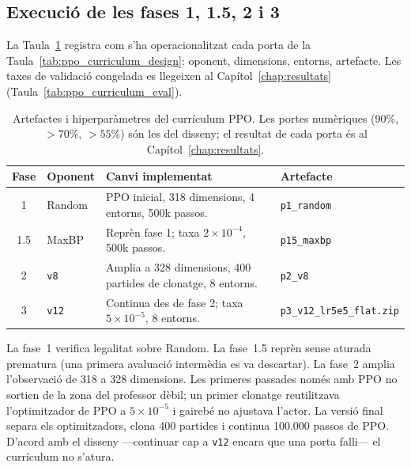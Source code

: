\subsection{Execució de les fases 1, 1.5, 2 i 3}
\label{subsec:ppo_phases_impl}

La Taula~\ref{tab:ppo_curriculum_impl} registra com s'ha operacionalitzat cada porta de la Taula~\ref{tab:ppo_curriculum_design}: oponent, dimensions, entorns, artefacte. Les taxes de validació congelada es llegeixen al Capítol~\ref{chap:resultats} (Taula~\ref{tab:ppo_curriculum_eval}).

\begin{table}[htbp]
    \centering
    \caption{Artefactes i hiperparàmetres del currículum PPO. Les portes numèriques (90\%, $>70\%$, $>55\%$) són les del disseny; el resultat de cada porta és al Capítol~\ref{chap:resultats}.}
    \label{tab:ppo_curriculum_impl}
    \small
    \renewcommand{\arraystretch}{1.25}
    \begin{tabularx}{\textwidth}{cl>{\raggedright\arraybackslash}Xl}
        \toprule
        \textbf{Fase} & \textbf{Oponent} & \textbf{Canvi implementat} & \textbf{Artefacte} \\
        \midrule
        1             & Random           & PPO inicial, 318 dimensions, 4 entorns, 500k passos.          & \texttt{p1\_random} \\
        \arrayrulecolor{gray!30}\hline\arrayrulecolor{black}
        1.5           & MaxBP            & Reprèn fase 1; taxa $2\times10^{-4}$, 500k passos.            & \texttt{p15\_maxbp} \\
        \arrayrulecolor{gray!30}\hline\arrayrulecolor{black}
        2             & \texttt{v8}      & Amplia a 328 dimensions, 400 partides de clonatge, 8 entorns. & \texttt{p2\_v8} \\
        \arrayrulecolor{gray!30}\hline\arrayrulecolor{black}
        3             & \texttt{v12}     & Continua des de fase 2; taxa $5\times10^{-5}$, 8 entorns.     & \texttt{p3\_v12\_lr5e5\_flat.zip} \\
        \bottomrule
    \end{tabularx}
\end{table}

La fase~1 verifica legalitat sobre Random. La fase~1.5 reprèn sense aturada prematura (una primera avaluació intermèdia es va descartar). La fase~2 amplia l'observació de 318 a 328 dimensions. Les primeres passades només amb PPO no sortien de la zona del professor dèbil; un primer clonatge reutilitzava l'optimitzador de PPO a $5\times 10^{-5}$ i gairebé no ajustava l'actor. La versió final separa els optimitzadors, clona 400 partides i continua 100.000 passos de PPO. D'acord amb el disseny ---continuar cap a \texttt{v12} encara que una porta falli--- el currículum no s'atura.

